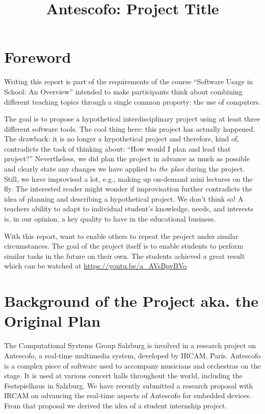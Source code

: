 \documentclass[onecolumn,nocopyrightspace,preprint]{sigplanconf}
\title{Antescofo: Project Title}
\begin{document}
\maketitle




\section{Foreword}  

Writing this report is part of the requirements of the course ``Software Usage
in School: An Overview'' intended to make participants think about combining
different teaching topics through a single common property: the use of
computers.

The goal is to propose a hypothetical interdisciplinary project using at least
three different software tools. The cool thing here: this project has actually
happened. The drawback: it is no longer a hypothetical project and therefore,
kind of, contradicts the task of thinking about: ``How would I plan and lead
that project?'' Nevertheless, we did plan the project in advance as much as
possible and clearly state any changes we have applied  to \textit{the plan}
during the project. Still, we have improvised a lot, e.g., making up on-demand
mini lectures on the fly. The interested reader might wonder if improvisation
further contradicts the idea of planning and describing a hypothetical
project.  We don't think so! A teachers ability to adapt to individual
student's knowledge, needs, and interests is, in our opinion, a key quality to
have in the educational business.

With this report, want to enable others to repeat the project under similar
circumstances. The goal of the project itself is to enable students to perform
similar tasks in the future on their own.  The students achieved a great
result which can be watched at \url{https://youtu.be/a_AVsBpvBVo}

\section{Background of the Project aka. the Original Plan}\label{sec:background}

The Computational Systems Group Salzburg is involved in a research project on
Antescofo, a real-time multimedia system, developed by IRCAM, Paris. Antescofo
is a complex piece of software used to accompany musicians and orchestras on
the stage. It is used at various concert halls throughout the world, including
the Festspielhaus in Salzburg. We have recently submitted a research proposal
with IRCAM on advancing the real-time aspects of Antescofo for embedded
devices. From that proposal we derived the idea of a student internship
project.
\end{document}
